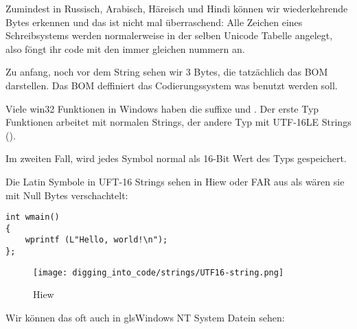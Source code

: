 Zumindest in Russisch, Arabisch, Häreisch und Hindi können wir wiederkehrende Bytes erkennen und das ist nicht mal überraschend:
Alle Zeichen eines Schreibsystems werden normalerweise in der selben Unicode Tabelle angelegt, also föngt ihr code mit den 
immer gleichen nummern an. %


Zu anfang, noch vor dem  String sehen wir 3 Bytes, die tatzächlich das \ac{BOM} darstellen.
Das \ac{BOM} deffiniert das Codierungssystem was benutzt werden soll.


Viele win32 Funktionen in Windows haben die suffixe  und . 
Der erste Typ Funktionen arbeitet mit normalen Strings, der andere Typ mit 
UTF-16LE Strings (). 


Im zweiten Fall, wird jedes Symbol normal als 16-Bit Wert des Typs  gespeichert.

Die Latin Symbole in UFT-16 Strings sehen in Hiew oder FAR aus als wären sie mit Null Bytes verschachtelt:

\begin{lstlisting}[style=customc]
int wmain()
{
	wprintf (L"Hello, world!\n");
};
\end{lstlisting}

\begin{figure}[H]
\centering
\texttt{[image: digging\_into\_code/strings/UTF16-string.png]}
\caption{Hiew}
\end{figure}

Wir können das oft auch in gls{Windows NT} System Datein sehen:


